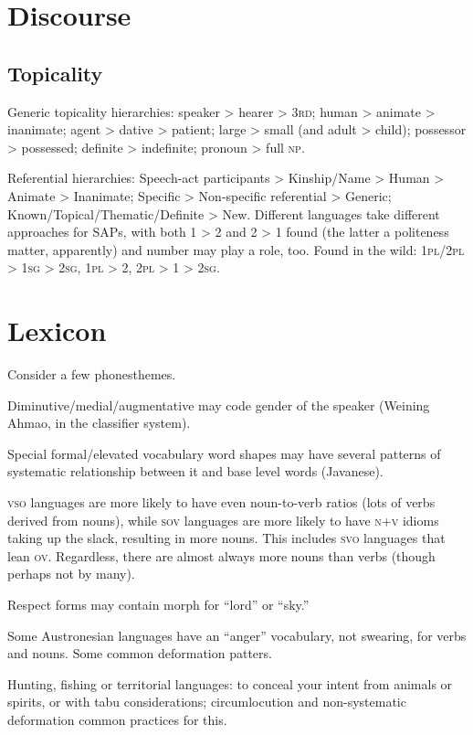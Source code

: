 \documentclass[11pt]{article}
\newcommand{\I}[1]{\textsc{#1}}   %
\begin{document}
\section{Discourse}

\subsection{Topicality}
Generic topicality hierarchies: speaker > hearer > \I{3rd}; human >
animate > inanimate; agent > dative > patient; large > small (and
adult > child); possessor > possessed; definite > indefinite; pronoun
> full \I{np}.

Referential hierarchies: Speech-act participants > Kinship/Name >
Human > Animate > Inanimate; Specific > Non-specific referential >
Generic; Known/Topical/Thematic/Definite > New.  Different languages
take different approaches for SAPs, with both 1 > 2 and 2 > 1 found
(the latter a politeness matter, apparently) and number may play a
role, too. Found in the wild: \I{1pl/2pl > 1sg > 2sg}, \I{1pl > 2},
\I{2pl > 1 > 2sg}.


\section{Lexicon}
Consider a few phonesthemes.

Diminutive/medial/augmentative may code gender of the speaker (Weining
Ahmao, in the classifier system).

Special formal/elevated vocabulary word shapes may have several
patterns of systematic relationship between it and base level words
(Javanese).

\I{vso} languages are more likely to have even noun-to-verb ratios
(lots of verbs derived from nouns), while \I{sov} languages are more
likely to have \I{n+v} idioms taking up the slack, resulting in more
nouns.  This includes \I{svo} languages that lean \I{ov}.  Regardless,
there are almost always more nouns than verbs (though perhaps not by
many).

Respect forms may contain morph for ``lord'' or ``sky.''

Some Austronesian languages have an ``anger'' vocabulary, not
swearing, for verbs and nouns.  Some common deformation patters.

Hunting, fishing or territorial languages: to conceal your intent from
animals or spirits, or with tabu considerations; circumlocution and
non-systematic deformation common practices for this.
\end{document}
